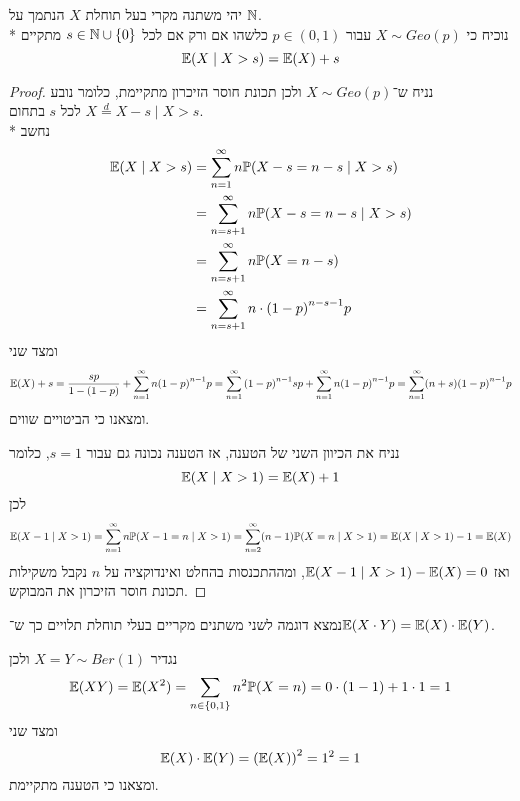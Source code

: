 \question{}
יהי משתנה מקרי בעל תוחלת $X$ הנתמך על $\mathbb{N}$. \\*
נוכיח כי $X \sim Geo(p)$ עבור $p \in (0, 1)$ כלשהו אם ורק אם לכל $s \in \mathbb{N} \cup \{0\}$ מתקיים
\[
	\mathbb{E}(X \mid X > s) = \mathbb{E}(X) + s
\]
\begin{proof}
	נניח ש־$X \sim Geo(p)$ ולכן תכונת חוסר הזיכרון מתקיימת, כלומר נובע $X \overset{d}{=} X - s \mid X > s$ לכל $s$ בתחום. \\*
	נחשב
	\begin{align*}
		\mathbb{E}(X \mid X > s)
		& = \sum_{n = 1}^{\infty} n \mathbb{P}(X - s = n - s \mid X > s) \\
		& = \sum_{n = s + 1}^{\infty} n \mathbb{P}(X - s = n - s \mid X > s) \\
		& = \sum_{n = s + 1}^{\infty} n \mathbb{P}(X = n - s) \\
		& = \sum_{n = s + 1}^\infty n \cdot {(1 - p)}^{n - s - 1} p
	\end{align*}
	ומצד שני
	\[
		\mathbb{E}(X) + s
		= \frac{s p}{1 - (1 - p)} + \sum_{n = 1}^{\infty} n {(1 - p)}^{n - 1} p
		= \sum_{n = 1}^{\infty} {(1 - p)}^{n - 1} s p + \sum_{n = 1}^{\infty} n {(1 - p)}^{n - 1} p
		= \sum_{n = 1}^{\infty} (n + s) {(1 - p)}^{n - 1} p
	\]
	ומצאנו כי הביטויים שווים.

	נניח את הכיוון השני של הטענה, אז הטענה נכונה גם עבור $s = 1$, כלומר
	\[
		\mathbb{E}(X \mid X > 1) = \mathbb{E}(X) + 1
	\]
	לכן
	\[
		\mathbb{E}(X - 1 \mid X > 1)
		= \sum_{n = 1}^{\infty} n \mathbb{P}(X - 1 = n \mid X > 1)
		= \sum_{n = 2}^{\infty} (n - 1) \mathbb{P}(X = n \mid X > 1)
		= \mathbb{E}(X \mid X > 1) - 1
		= \mathbb{E}(X)
	\]
	ואז $\mathbb{E}(X - 1 \mid X > 1) - \mathbb{E}(X) = 0$, ומההתכנסות בהחלט ואינדוקציה על $n$ נקבל משקילות תכונת חוסר הזיכרון את המבוקש.
\end{proof}

\question{}
נמצא דוגמה לשני משתנים מקריים בעלי תוחלת תלויים כך ש־$\mathbb{E}(X \cdot Y) = \mathbb{E}(X) \cdot \mathbb{E}(Y)$.
\begin{solution}
	נגדיר $X = Y \sim Ber(1)$ ולכן
	\[
		\mathbb{E}(XY)
		= \mathbb{E}(X^2)
		= \sum_{n \in \{0, 1\}} n^2 \mathbb{P}(X = n)
		= 0 \cdot (1 - 1) + 1 \cdot 1
		= 1
	\]
	ומצד שני
	\[
		\mathbb{E}(X) \cdot \mathbb{E}(Y)
		= {(\mathbb{E}(X))}^2
		= 1^2
		= 1
	\]
	ומצאנו כי הטענה מתקיימת.
\end{solution}


